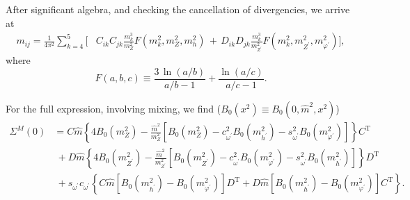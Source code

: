 After significant algebra, and checking the cancellation of divergencies, we arrive at 
%
\begin{align}\label{eq:masses_general}
 m_{ij} = \frac{1}{4\pi^2}\sum_{k=4}^5 \Big[ & C_{ik} C_{jk} \frac{m_k^3}{m_Z^2}F(m_k^2,m_Z^2,m_h^2)  \,+\, D_{ik} D_{jk} \frac{m_k^3}{m_{Z^\prime}^2}F(m_k^2,m_{Z^\prime}^2,m_{\varphi^\prime}^2) \Big],
\end{align} 
%
where
%
\begin{equation} \label{eq:loop_function}
F(a,b,c) \equiv \frac{3 \, \ln{(a/b)}}{a/b - 1}  + \frac{\ln{(a/c)}}{a/c - 1}.
\end{equation}
%

For the full expression, involving mixing, we find ($B_0(x^2) \equiv B_0(0,\hat{m}^2,x^2)$)
%
\begin{align*}
%
    \Sigma^M(0) &= C\hat{m}\left\{ 4B_0(m_Z^2) -
\frac{\hat{m}^2}{m_Z^2}\left[B_0(m_Z^2) - c_{\omega^\prime}^2B_0(m_{h^\prime}^2)- s_{\omega^\prime}^2B_0(m_{\varphi^\prime}^2)\right] \right\}C^\text{T}\\
%
&~+D\hat{m}\left\{ 4B_0(m_{Z^\prime}^2) -
\frac{\hat{m}^2}{m_{Z^\prime}^2}\left[B_0(m_{Z^\prime}^2) - c_{\omega^\prime}^2B_0(m_{\varphi^\prime}^2)- s_{\omega^\prime}^2B_0(m_{h^\prime}^2)\right] \right\}D^\text{T}\\
%
&~+s_{\omega^\prime} c_{\omega^\prime} \left\{C\hat{m}\left[B_0(m_{h^\prime}^2) -B_0(m_{\varphi^\prime}^2) \right]D^\text{T}+D\hat{m}\left[ B_0(m_{h^\prime}^2) -B_0(m_{\varphi^\prime}^2) \right]C^\text{T}\right\}.
%
\end{align*}
